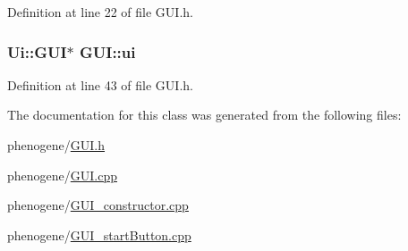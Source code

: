 Definition at line 22 of file G\-U\-I.\-h.

\hypertarget{a00002_acdbca1224663f5a19bd1ad4e7c885886}{
\subsubsection[{ui}]{\setlength{\rightskip}{0pt plus 5cm}Ui\-::\-G\-U\-I$\ast$ G\-U\-I\-::ui\hspace{0.3cm}{\ttfamily [private]}}}\label{d7/d46/a00002_acdbca1224663f5a19bd1ad4e7c885886}


Definition at line 43 of file G\-U\-I.\-h.



The documentation for this class was generated from the following files\-:\begin{DoxyCompactItemize}
\item 
phenogene/\hyperlink{a00010}{G\-U\-I.\-h}\item 
phenogene/\hyperlink{a00009}{G\-U\-I.\-cpp}\item 
phenogene/\hyperlink{a00011}{G\-U\-I\-\_\-constructor.\-cpp}\item 
phenogene/\hyperlink{a00012}{G\-U\-I\-\_\-start\-Button.\-cpp}\end{DoxyCompactItemize}
